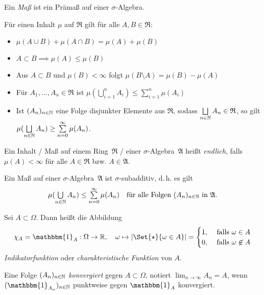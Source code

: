 \documentclass{cheat-sheet}
\newcommand{\Alg}{\mathfrak{A}} %
\newcommand{\Ring}{\mathfrak{R}} %
\newcommand{\ind}{\mathbbm{1}} %
\theoremstyle{definition}
\begin{document}
\begin{defn}
  Ein \emph{Maß} ist ein Prämaß auf einer $\sigma$-Algebra.
\end{defn}

\begin{satz}
  Für einen Inhalt $\mu$ auf $\Ring$ gilt für alle $A, B \in \Ring$:
  \begin{itemize}
    \item $\mu(A \cup B) + \mu(A \cap B) = \mu(A) + \mu(B)$
    \item $A \subset B \implies \mu(A) \leq \mu(B)$ 
    \item Aus $A \subset B$ und $\mu(B) < \infty$ folgt $\mu(B \setminus A) = \mu(B) - \mu(A)$
    \item Für $A_1, ..., A_n \in \Ring$ ist $\mu\left(\bigcup_{i = 1}^n A_i \right) \leq \sum_{i = 1}^n \mu(A_i)$ 
    \item Ist $(A_n)_{n \in \mathbb{N}}$ eine Folge disjunkter Elemente aus $\Ring$, sodass $\bigsqcup_{n \in \N} A_n \in \Ring$, so gilt $\mu(\bigsqcup_{n \in \N} A_n) \geq \sum_{n=0}^\infty \mu(A_n)$.
  \end{itemize}
\end{satz}

\begin{defn}
  Ein Inhalt / Maß auf einem Ring~$\Ring$ / einer $\sigma$-Algebra~$\Alg$ heißt \emph{endlich}, falls $\mu(A) < \infty$ für alle $A \in \Ring$ bzw. $A \in \Alg$.
\end{defn}

\begin{satz}
  Ein Maß auf einer $\sigma$-Algebra~$\Alg$ ist $\sigma$-subadditiv, d.\,h. es gilt
  \[ \mu(\bigcup_{n \in \N} A_n) \leq \sum_{n=0}^\infty \mu(A_n) \quad \text{für alle Folgen $(A_n)_{n \in \N}$ in $\Alg$}. \]
\end{satz}

\begin{defn}
  Sei $A \subset \Omega$. Dann heißt die Abbildung
  \[ \chi_A = \ind_A : \Omega \to \R, \quad \omega \mapsto \abs{\Set{ \star }{ \omega \in A }} = \begin{cases} 1, & \text{ falls } \omega \in A \\ 0, & \text{ falls } \omega \not\in A \end{cases} \]
  \emph{Indikatorfunktion} oder \emph{charakteristische Funktion} von $A$.
\end{defn}

\begin{defn}
  Eine Folge $(A_n)_{n \in \mathbb{N}}$ \emph{konvergiert} gegen $A \subset \Omega$, notiert $\lim_{n \to \infty} A_n = A$, wenn $(\ind_{A_n})_{n \in \N}$ punktweise gegen $\ind_A$ konvergiert.
\end{defn}
\end{document}
